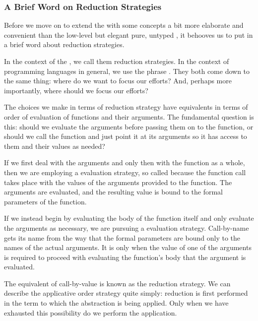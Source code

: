 \subsubsection{A Brief Word on Reduction Strategies}\label{untyped:strategies}
Before we move on to extend the \lambdacalc with some concepts a bit more elaborate and convenient than the low-level but elegant pure, untyped \lambdacalc{}, it behooves us to put in a brief word about reduction strategies.

In the context of the \lambdacalc{}, we call them reduction strategies. In the context of programming languages in general, we use the phrase . They both come down to the same thing: where do we want to focus our efforts? And, perhaps more importantly, where should we focus our efforts? 

The choices we make in terms of \lambdacalc reduction strategy have equivalents in terms of order of evaluation of functions and their arguments. The fundamental question is this: should we evaluate the arguments before passing them on to the function, or should we call the function and just point it at its arguments so it has access to them and their values as needed?

If we first deal with the arguments and only then with the function as a whole, then we are employing a  evaluation strategy, so called because the function call takes place with the values of the arguments provided to the function. The arguments are evaluated, and the resulting value is bound to the formal parameters of the function.

If we instead begin by evaluating the body of the function itself and only evaluate the arguments as necessary, we are pursuing a  evaluation strategy. Call-by-name gets its name from the way that the formal parameters are bound only to the names of the actual arguments. It is only when the value of one of the arguments is required to proceed with evaluating the function's body that the argument is evaluated.

The \lambdacalc equivalent of call-by-value is known as the  reduction strategy. We can describe the applicative order strategy quite simply: reduction is first performed in the term to which the abstraction is being applied. Only when we have exhausted this possibility do we perform the application.

